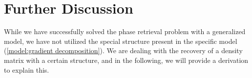 \documentclass{article}
\numberwithin{equation}{section}
\begin{document}

\section{Further Discussion}
While we have successfully solved the phase retrieval problem with a generalized model, we have not utilized the special structure present in the specific model (\ref{model:gradient decomposition}). We are dealing with the recovery of a density matrix with a certain structure, and in the following, we will provide a derivation to explain this.
  
\end{document}
